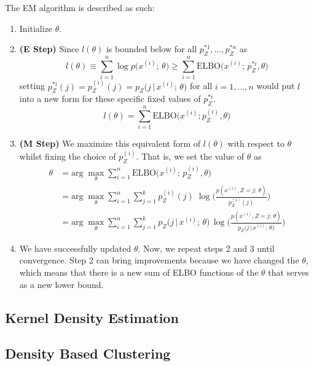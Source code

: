 \documentclass{article}
\begin{document}
\begin{definition}
        The EM algorithm is described as such: 
        \begin{enumerate}
          \item Initialize $\theta$.
          \item \textbf{(E Step)} Since $l(\theta)$ is bounded below for all $p_Z^{*1}, \ldots, p_Z^{*n}$ as 
            \[l(\theta) \equiv \sum_{i=1}^n \log p\big( x^{(i)}; \, \theta\big) \geq \sum_{i=1}^n \text{ELBO}\big( x^{(i)}; \, p_Z^{*i}, \theta\big)\]
          setting $p_Z^{*i} (j) = p_Z^{(i)} (j) = p_Z \big(j\,|\, x^{(i)}; \, \theta\big)$ for all $i = 1, \ldots, n$ would put $l$ into a new form for these specific fixed values of $p_Z^{*i}$. 
            \[l(\theta) = \sum_{i=1}^n \text{ELBO}\big(x^{(i)}; p_Z^{(i)}, \theta \big)\]
          \item \textbf{(M Step)} We maximize this equivalent form of $l(\theta)$ with respect to $\theta$ whilst fixing the choice of $p_Z^{(i)}$. That is, we set the value of $\theta$ as 
          \begin{align*}  
            \theta & = \text{arg}\; \max_\theta \sum_{i=1}^n \text{ELBO} \big( x^{(i)}; \, p_Z^{(i)}, \theta \big) \\
            & = \text{arg}\; \max_\theta \sum_{i=1}^n \sum_{j=1}^k p_Z^{(i)} (j)\; \log \bigg( \frac{p(x^{(i)}, Z = j; \, \theta)}{p_Z^{(i)} (j)} \bigg) \\
            & = \text{arg}\; \max_\theta \sum_{i=1}^n \sum_{j = 1}^k p_Z \big(j\,|\, x^{(i)}; \, \theta \big)\, \log \bigg( \frac{p(x^{(i)}, Z = j; \, \theta)}{p_Z \big(j\,|\, x^{(i)}; \, \theta \big)} \bigg)
          \end{align*}
          \item We have successfully updated $\theta$. Now, we repeat steps 2 and 3 until convergence. Step 2 can bring improvements because we have changed the $\theta$, which means that there is a new sum of ELBO functions of the $\theta$ that serves as a new lower bound.
        \end{enumerate}
      \end{definition}
  \subsection{Kernel Density Estimation} 

  \subsection{Density Based Clustering}
\end{document}
